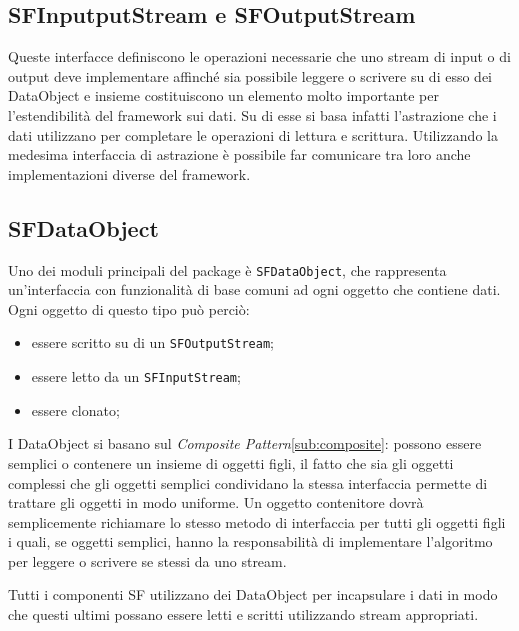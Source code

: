 \subsection{SFInputputStream e SFOutputStream}
\label{sub:sfinoutstream}
Queste interfacce definiscono le operazioni necessarie che uno stream di input o di output deve implementare affinch\'e sia possibile leggere o scrivere su di esso dei DataObject e insieme costituiscono un elemento molto importante per l'estendibilit\`a del framework sui dati. Su di esse si basa infatti l'astrazione che i dati utilizzano per completare le operazioni di lettura e scrittura. Utilizzando la medesima interfaccia di astrazione \`e possibile far comunicare tra loro anche implementazioni diverse del framework.

\subsection{SFDataObject}
\label{sub:sfdataobject}
Uno dei moduli principali del package \`e \texttt{SFDataObject}, che rappresenta un'interfaccia con funzionalit\`a di base comuni ad ogni oggetto che contiene dati. 
Ogni oggetto di questo tipo pu\`o perci\`o:
\begin{itemize}
	\item essere scritto su di un \texttt{SFOutputStream};
	\item essere letto da un \texttt{SFInputStream};
	\item essere clonato;
\end{itemize}
I DataObject si basano sul \textit{Composite Pattern}\ref{sub:composite}: possono essere semplici o contenere un insieme di oggetti figli, il fatto che sia gli oggetti complessi che gli oggetti semplici condividano la stessa interfaccia permette di trattare gli oggetti in modo uniforme. Un oggetto contenitore dovr\`a semplicemente richiamare lo stesso metodo di interfaccia per tutti gli oggetti figli i quali, se oggetti semplici, hanno la responsabilit\`a di implementare l'algoritmo per leggere o scrivere se stessi da uno stream.

Tutti i componenti SF utilizzano dei DataObject per incapsulare i dati in modo che questi ultimi possano essere letti e scritti utilizzando stream appropriati.

